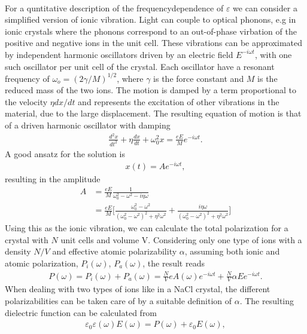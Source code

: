 \\
For a quntitative description of the frequencydependence of $\varepsilon$ we can consider a simplified
version of ionic vibration.
Light can couple to optical phonons, e.g in ionic crystals where the phonons correspond to
an out-of-phase virbation of the positive and negative ions in the unit cell. 
These vibrations can be approximated by independent harmonic oscillators driven by an electric field
$E ^{-i\omega t}$, with one such oscillator per unit cell of the crystal. Each oscillator have a 
resonant frequency of $\omega_o = (2\gamma/M)^{1/2}$, where $\gamma$ is the force constant and
$M$ is the reduced mass of the two ions. The motion is damped by a term proportional to the velocity
$\eta d\!x\!/\!d\!t$ and represents the excitation of other vibrations in the material,
due to the large displacement. 
The resulting equation of motion is that of a driven harmonic oscillator with damping
\begin{align}
   \frac{d^2x}{dt^2} + \eta \frac{dx}{dt} + \omega_0^2 x = \frac{eE}{M}e^{-i\omega t}.
\end{align}
A good ansatz for the solution is 
\begin{align}
   x(t) = Ae^{-i \omega t},
\end{align}
resulting in the amplitude
\begin{align}
   A &= \frac{eE}{M} \frac{1}{\omega_0^2 - \omega^2 - i \eta \omega}  \\
     &=  \frac{eE}{M} \Bigg[ \frac{\omega_0^2 - \omega^2}{(\omega_0^2 - \omega^2)^2 +\eta^2 \omega^2} 
+ \frac{i\eta \omega}{(\omega_0^2 - \omega^2)^2 + \eta^2 \omega^2} \Bigg]
\end{align}
Using this as the ionic vibration, we can calculate the total polarization for a crystal with
$N$ unit cells and volume V. Considering only one type of ions with a density $N/V$ and effective
atomic polarizability $\alpha$, assuming both ionic and atomic polarization, $P_i(\omega)$, $P_a(\omega)$,
the result reads
\begin{align}
   P(\omega) = P_i(\omega) + P_a(\omega) = \frac{N}{V}eA(\omega)e^{-i \omega t} + \frac{N}{V}\alpha E e^{-i \omega t}.
\end{align}
When dealing with two types of ions like in a NaCl crystal, the different polarizabilities can be
taken care of by a suitable definition of $\alpha$. The resulting dielectric function can be calculated
from
\begin{align}
   \varepsilon_0 \varepsilon (\omega) E(\omega) = P(\omega) + \varepsilon_0 E(\omega),
\end{align}
